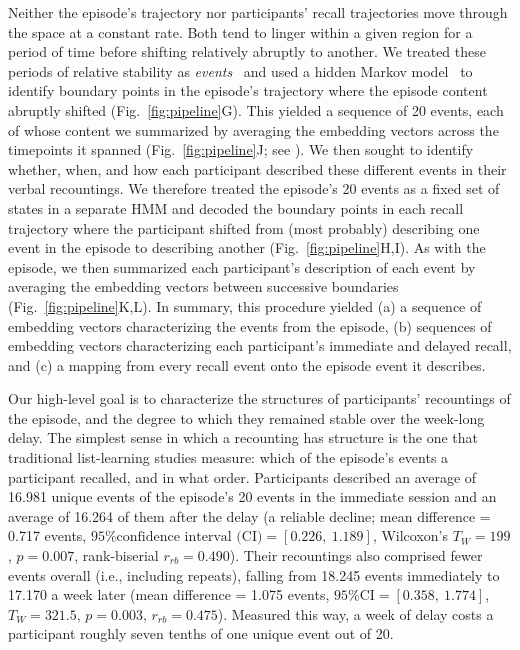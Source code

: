 \documentclass[10pt]{article}
\renewcommand{\nameref}[1]{\textit{\oldnameref{#1}}}
\begin{document}
Neither the episode's trajectory nor participants' recall trajectories move through the space at a constant rate.
Both tend to linger within a given region for a period of time before shifting relatively abruptly to another. 
We treated these periods of relative stability as \textit{events}~\citep{RadvZack17,EzzyDava11} and used a hidden Markov model~\citep[HMM;][]{BaumPetr66,BaldEtal17,KumaEtal21} to identify boundary points in the episode's trajectory where the episode content abruptly shifted (Fig.~\ref{fig:pipeline}G).
This yielded a sequence of 20 events, each of whose content we summarized by averaging the embedding vectors across the timepoints it spanned (Fig.~\ref{fig:pipeline}J; see \nameref{subsec:eventseg}).
We then sought to identify whether, when, and how each participant described these different events in their verbal recountings.
We therefore treated the episode's 20 events as a fixed set of states in a separate HMM and decoded the boundary points in each recall trajectory where the participant shifted from (most probably) describing one event in the episode to describing another (Fig.~\ref{fig:pipeline}H,I).
As with the episode, we then summarized each participant's description of each event by averaging the embedding vectors between successive boundaries (Fig.~\ref{fig:pipeline}K,L).
In summary, this procedure yielded (a) a sequence of embedding vectors characterizing the events from the episode, (b) sequences of embedding vectors characterizing each participant's immediate and delayed recall, and (c) a mapping from every recall event onto the episode event it describes.

Our high-level goal is to characterize the structures of participants' recountings of the episode, and the degree to which they remained stable over the week-long delay.
The simplest sense in which a recounting has structure is the one that traditional list-learning studies measure: which of the episode's events a participant recalled, and in what order.
Participants described an average of 16.981 unique events of the episode's 20 events in the immediate session and an average of 16.264 of them after the delay (a reliable decline; mean difference = 0.717 events, $\text{95\% confidence interval (CI)} = \left[0.226,~1.189\right]$, Wilcoxon's $T_W = 199$, $p = 0.007$, rank-biserial $r_{rb} = 0.490$).
Their recountings also comprised fewer events overall (i.e., including repeats), falling from 18.245 events immediately to 17.170 a week later (mean difference = 1.075 events, $\text{95\% CI} = \left[0.358,~1.774\right]$, $T_W = 321.5$, $p = 0.003$, $r_{rb} = 0.475$).
Measured this way, a week of delay costs a participant roughly seven tenths of one unique event out of 20.
\end{document}
